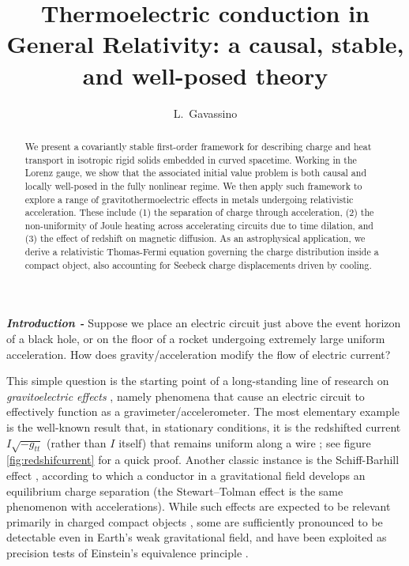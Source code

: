 \documentclass[a4paper, amsfonts, amssymb, amsmath, reprint, showkeys, nofootinbib, twoside,notitlepage]{revtex4-1}
\theoremstyle{definition}
\theoremstyle{theorem}
\begin{document}
\title{Thermoelectric conduction in General Relativity: a causal, stable, and well-posed theory}
\author{L.~Gavassino}

\begin{abstract}
We present a covariantly stable first-order framework for describing charge and heat transport in isotropic rigid solids embedded in curved spacetime. Working in the Lorenz gauge, we show that the associated initial value problem is both causal and locally well-posed in the fully nonlinear regime. We then apply such framework to explore a range of gravitothermoelectric effects in metals undergoing relativistic acceleration. These include (1) the separation of charge through acceleration, (2) the non-uniformity of Joule heating across accelerating circuits due to time dilation, and (3) the effect of redshift on magnetic diffusion. As an astrophysical application, we derive a relativistic Thomas-Fermi equation governing the charge distribution inside a compact object, also accounting for Seebeck charge displacements driven by cooling.
\end{abstract} 
\vspace{-0.2cm}

\maketitle
\noindent\textit{\bf Introduction -} Suppose we place an electric circuit just above the event horizon of a black hole, or on the floor of a rocket undergoing extremely large uniform acceleration. How does gravity/acceleration modify the flow of electric current? 

This simple question is the starting point of a long-standing line of research on \textit{gravitoelectric effects} \cite{TolmanStewart1916,DeWittDrag1966,Anandan1984,Ahmedov:1998mif,Ahmedov:1999bqr,Ahmedov:2002bx,Ummarino:2017bvz,WangStewartTolman2023,BeiPhD,Gavassino:2025wcy}, namely phenomena that cause an electric circuit to effectively function as a gravimeter/accelerometer. The most elementary example is the well-known result that, in stationary conditions, it is the redshifted current $I\sqrt{-g_{tt}}$ (rather than $I$ itself) that remains uniform along a wire \cite{Anandan1984}; see figure \ref{fig:redshifcurrent} for a quick proof. Another classic instance is the Schiff-Barhill effect \cite{ShiffBarhill1966}, according to which a conductor in a gravitational field develops an equilibrium charge separation (the Stewart–Tolman effect \cite{TolmanStewart1916,Bhatia1969,Gavassino:2025wcy} is the same phenomenon with accelerations). While such effects are expected to be relevant primarily in charged compact objects \cite{Bhatia1969,Bekenstein1971,Zhand1982,Alcock1986,Usov:2004iz,Usov:2004kj,Ray:2003gt,Ray:2004yr,Negreiros:2009fd,Yousaf2016,Carvalho:2018kbt,FRocha2020,Bhatti2020,Arbanil2022,Sharif:2023vpb,Masa2023}, some are sufficiently pronounced to be detectable even in Earth’s weak gravitational field, and have been exploited as precision tests of Einstein’s equivalence principle \cite{Jain1987}.
\end{document}
